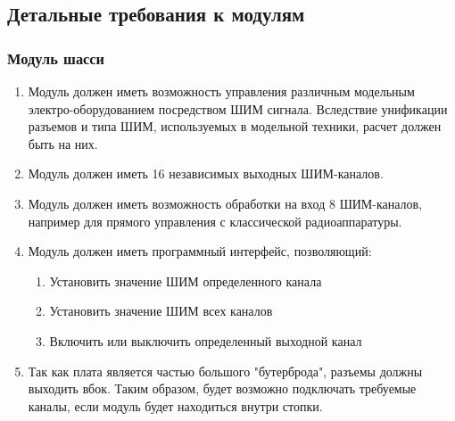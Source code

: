 \documentclass[utf8]{report}
\begin{document}
\subsection{Детальные требования к модулям}

\subsubsection{Модуль шасси}
\begin{enumerate}
  \item Модуль должен иметь возможность управления различным модельным электро-оборудованием посредством ШИМ сигнала. Вследствие унификации разъемов и типа ШИМ, используемых в модельной техники, расчет должен быть на них.
  \item Модуль должен иметь 16 независимых выходных ШИМ-каналов.
  \item Модуль должен иметь возможность обработки на вход 8 ШИМ-каналов, например для прямого управления с классической радиоаппаратуры.
  \item Модуль должен иметь программный интерфейс, позволяющий:
  \begin{enumerate}
    \item Установить значение ШИМ определенного канала
    \item Установить значение ШИМ всех каналов
    \item Включить или выключить определенный выходной канал
  \end{enumerate}
  \item Так как плата является частью большого "бутерброда", разъемы должны выходить вбок. Таким образом, будет возможно подключать требуемые каналы, если модуль будет находиться внутри стопки.
\end{enumerate}
\end{document}
